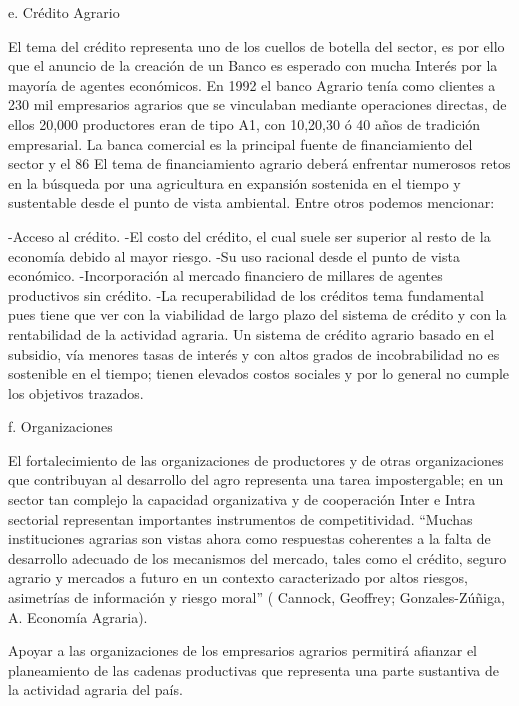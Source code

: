 \documentclass{report}
\begin{document}
e. Crédito Agrario

El tema del crédito representa uno de los cuellos de botella del sector, es por ello que el anuncio de la creación de un Banco es esperado con mucha Interés por la mayoría de agentes económicos.
En 1992 el banco Agrario tenía como clientes a 230 mil empresarios agrarios que se vinculaban mediante operaciones directas, de ellos 20,000 productores eran de tipo A1, con 10,20,30 ó 40 años de tradición empresarial.
La banca comercial es la principal fuente de financiamiento del sector y el 86%
El tema de financiamiento agrario deberá enfrentar numerosos retos en la búsqueda por una agricultura en expansión sostenida en el tiempo y sustentable desde el punto de vista ambiental. Entre otros podemos mencionar:

-Acceso al crédito.
-El costo del crédito, el cual suele ser superior al resto de la economía debido al mayor riesgo.
-Su uso racional desde el punto de vista económico.
-Incorporación al mercado financiero de millares de agentes productivos sin crédito.
-La recuperabilidad de los créditos tema fundamental pues tiene que ver con la viabilidad de largo plazo del sistema de crédito y con la rentabilidad de la actividad agraria. Un sistema de crédito agrario basado en el subsidio, vía menores tasas de interés y con altos grados de incobrabilidad no es sostenible en el tiempo; tienen elevados costos sociales y por lo general no cumple los objetivos trazados.

f. Organizaciones

El fortalecimiento de las organizaciones de productores y de otras organizaciones que contribuyan al desarrollo del agro representa una tarea impostergable; en un sector tan complejo la capacidad organizativa y de cooperación Inter e Intra sectorial representan importantes instrumentos de competitividad. “Muchas instituciones agrarias son vistas ahora como respuestas coherentes a la falta de desarrollo adecuado de los mecanismos del mercado, tales como el crédito, seguro agrario y mercados a futuro en un contexto caracterizado por altos riesgos, asimetrías de información y riesgo moral” ( Cannock, Geoffrey; Gonzales-Zúñiga, A. Economía Agraria).

Apoyar a las organizaciones de los empresarios agrarios permitirá afianzar el
planeamiento de las cadenas productivas que representa una parte sustantiva de
la actividad agraria del país.
\end{document}
